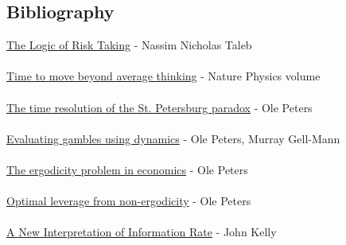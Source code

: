\documentclass[12pt]{article}
\begin{document}
\subsection{Bibliography}
\href{https://medium.com/incerto/the-logic-of-risk-taking-107bf41029d3}{The Logic of Risk Taking} - Nassim Nicholas Taleb
\\\\
\href{https://www.nature.com/articles/s41567-019-0758-3}{Time to move beyond average thinking} - Nature Physics volume
\\\\
\href{https://arxiv.org/abs/1011.4404}{The time resolution of the St. Petersburg paradox} - Ole Peters
\\\\
\href{https://arxiv.org/abs/1405.0585}{Evaluating gambles using dynamics} - Ole Peters, Murray Gell-Mann
\\\\
\href{https://www.nature.com/articles/s41567-019-0732-0}{The ergodicity problem in economics} - Ole Peters
\\\\
\href{https://arxiv.org/abs/0902.2965}{Optimal leverage from non-ergodicity} - Ole Peters
\\\\
\href{https://www.princeton.edu/~wbialek/rome/refs/kelly_56.pdf}{A New Interpretation of Information Rate} - John Kelly
\end{document}
